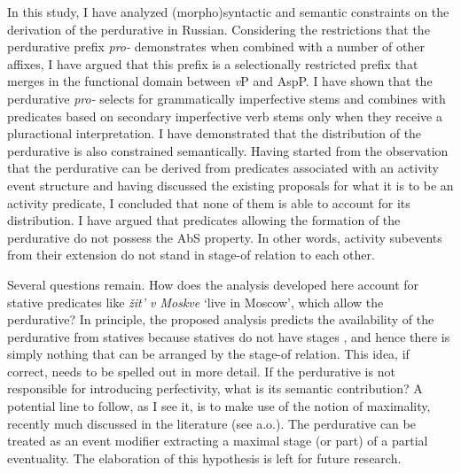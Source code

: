 \documentclass[output=paper,
]{langscibook}
\begin{document}
In this study, I have analyzed (morpho)syntactic and semantic constraints on the derivation of the perdurative in Russian. Considering the restrictions that the perdurative prefix \textit{pro-} demonstrates when combined with a number of other affixes, I have argued that this prefix is a selectionally restricted prefix that merges in the functional domain between \textit{v}P and AspP. I have shown that the perdurative \textit{pro-} selects for grammatically imperfective stems and combines with predicates based on secondary imperfective verb stems only when they receive a pluractional interpretation. I have demonstrated that the distribution of the perdurative is also constrained semantically. Having started from the observation that the perdurative can be derived from predicates associated with an activity event structure and having discussed the existing proposals for what it is to be an activity predicate, I concluded that none of them is able to account for its distribution. I have argued that predicates allowing the formation of the perdurative do not possess the AbS property. In other words, activity subevents from their extension do not stand in  stage-of relation to each other.

Several questions remain. How does the analysis developed here account for stative predicates like \textit{žit’ v Moskve} `live in Moscow', which allow the perdurative? In principle, the proposed analysis predicts the availability of the perdurative from statives because statives do not have stages \citep{landman1992progressive}, and hence there is simply nothing that can be arranged by the stage-of relation. This idea, if correct, needs to be spelled out in more detail. If the perdurative is not responsible for introducing perfectivity, what is its semantic contribution? A potential line to follow, as I see it, is to make use of the notion of maximality, recently much discussed in the literature (see \citealt{altshuler2014,filip2017semantics} a.o.). The perdurative can be treated as an event modifier extracting a maximal stage (or part) of a partial eventuality. The elaboration of this hypothesis is left for future research.
\end{document}
